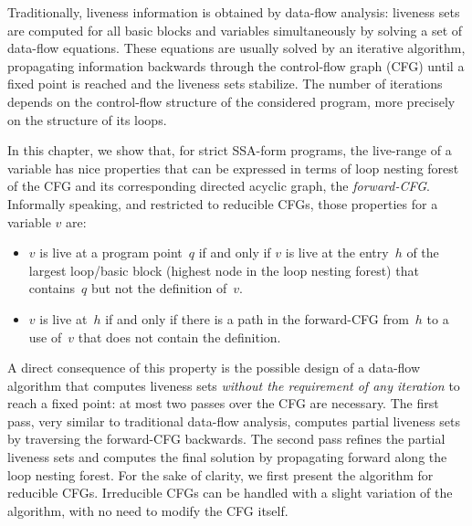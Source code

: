 
Traditionally, liveness information is obtained by data-flow analysis:
liveness sets are computed for all basic blocks and variables simultaneously by solving a set of data-flow equations.
These equations are usually solved by an iterative algorithm, propagating information backwards through the control-flow graph (CFG) until a fixed point is reached and the liveness sets stabilize.
The number of iterations depends on the control-flow structure of the considered program, more precisely on the structure of its loops.

In this chapter, we show that, for strict SSA-form programs, the live-range of a variable has nice properties that can be expressed in terms of loop nesting forest of the CFG and its corresponding directed acyclic graph, the \emph{forward-CFG}.
Informally speaking, and restricted to reducible CFGs, those properties for a variable $v$ are:
\begin{itemize}
\item
	$v$ is live at a program point~$q$ if and only if $v$ is live at the entry~$h$ of the largest loop/basic block (highest node in the loop nesting forest) that contains~$q$ but not the definition of~$v$.
\item
	$v$ is live at~$h$ if and only if there is a path in the forward-CFG from~$h$ to a use of~$v$ that does not contain the definition.
\end{itemize}


A direct consequence of this property is the possible design of a data-flow algorithm that computes liveness sets \emph{without the requirement of any iteration} to reach a fixed point:
at most two passes over the CFG are necessary.
The first pass, very similar to traditional data-flow analysis, computes partial liveness sets by traversing the forward-CFG backwards.
The second pass refines the partial liveness sets and computes the final solution by propagating forward along the loop nesting forest.
For the sake of clarity, we first present the algorithm for reducible CFGs.
Irreducible CFGs can be handled with a slight variation of the algorithm, with no need to modify the CFG itself.

